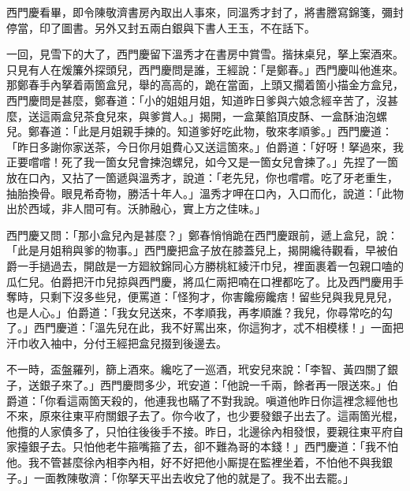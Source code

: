 西門慶看畢，即令陳敬濟書房內取出人事來，同溫秀才封了，將書謄寫錦箋，彌封停當，印了圖書。另外又封五兩白銀與下書人王玉，不在話下。

一回，見雪下的大了，西門慶留下溫秀才在書房中賞雪。揩抹桌兒，拏上案酒來。只見有人在煖簾外探頭兒，西門慶問是誰，王經說：「是鄭春。」西門慶叫他進來。那鄭春手內拏着兩箇盒兒，舉的高高的，跪在當面，上頭又擱着箇小描金方盒兒，西門慶問是甚麼，鄭春道：「小的姐姐月姐，知道昨日爹與六娘念經辛苦了，沒甚麼，送這兩盒兒茶食兒來，與爹賞人。」揭開，一盒菓餡頂皮酥、一盒酥油泡螺兒。鄭春道：「此是月姐親手揀的。知道爹好吃此物，敬來孝順爹。」西門慶道：「昨日多謝你家送茶，今日你月姐費心又送這箇來。」伯爵道：「好呀！拏過來，我正要嚐嚐！死了我一箇女兒會揀泡螺兒，如今又是一箇女兒會揀了。」先捏了一箇放在口內，又拈了一箇遞與溫秀才，說道：「老先兒，你也嚐嚐。吃了牙老重生，抽胎換骨。眼見希奇物，勝活十年人。」{}溫秀才呷在口內，入口而化，說道：「此物出於西域，非人間可有。沃肺融心，實上方之佳味。」

西門慶又問：「那小盒兒內是甚麼？」鄭春悄悄跪在西門慶跟前，遞上盒兒，說：「此是月姐稍與爹的物事。」西門慶把盒子放在膝蓋兒上，揭開纔待觀看，早被伯爵一手撾過去，開啟是一方廻紋錦同心方勝桃紅綾汗巾兒，裡面裹着一包親口嗑的瓜仁兒。伯爵把汗巾兒掠與西門慶，將瓜仁兩把喃在口裡都吃了。比及西門慶用手奪時，只剩下沒多些兒，{}便罵道：「怪狗才，你害饞癆饞痞！留些兒與我見見兒，也是人心。」伯爵道：「我女兒送來，不孝順我，再孝順誰？我兒，你尋常吃的勾了。」{}西門慶道：「溫先兒在此，我不好罵出來，你這狗才，忒不相模樣！」一面把汗巾收入袖中，分付王經把盒兒掇到後邊去。

不一時，盃盤羅列，篩上酒來。纔吃了一巡酒，玳安兒來說：「李智、黃四關了銀子，送銀子來了。」西門慶問多少，玳安道：「他說一千兩，餘者再一限送來。」伯爵道：「你看這兩箇天殺的，他連我也瞞了不對我說。嗔道他昨日你這裡念經他也不來，原來往東平府關銀子去了。你今收了，也少要發銀子出去了。這兩箇光棍，他攬的人家債多了，只怕往後後手不接。昨日，北邊徐內相發恨，要親往東平府自家擡銀子去。只怕他老牛箍嘴箍了去，卻不難為哥的本錢！」{}西門慶道：「我不怕他。我不管甚麼徐內相李內相，好不好把他小厮提在監裡坐着，不怕他不與我銀子。」一面教陳敬濟：「你拏天平出去收兌了他的就是了。我不出去罷。」

